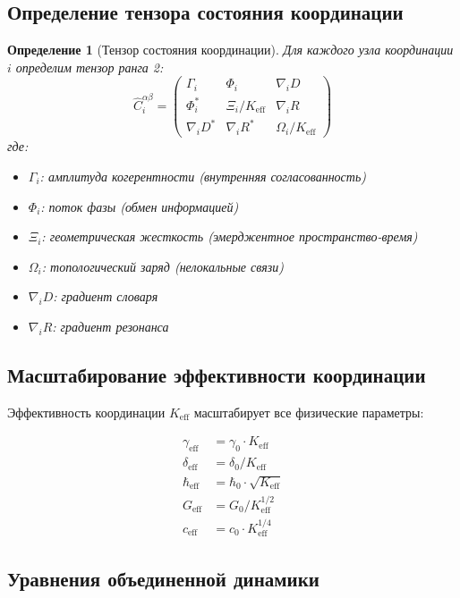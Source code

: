 \documentclass[11pt,a4paper]{article}
\newtheorem{definition}{Определение}
\begin{document}
	\subsection{Определение тензора состояния координации}
	
	\begin{definition}[Тензор состояния координации]
		Для каждого узла координации $i$ определим тензор ранга 2:
		\[
		\hat{C}_i^{\alpha\beta} = \begin{pmatrix}
			\Gamma_i & \Phi_i & \nabla_i D \\
			\Phi_i^* & \Xi_i/K_{\mathrm{eff}} & \nabla_i R \\
			\nabla_i D^* & \nabla_i R^* & \Omega_i/K_{\mathrm{eff}}
		\end{pmatrix}
		\]
		где:
		\begin{itemize}
			\item $\Gamma_i$: амплитуда когерентности (внутренняя согласованность)
			\item $\Phi_i$: поток фазы (обмен информацией)  
			\item $\Xi_i$: геометрическая жесткость (эмерджентное пространство-время)
			\item $\Omega_i$: топологический заряд (нелокальные связи)
			\item $\nabla_i D$: градиент словаря
			\item $\nabla_i R$: градиент резонанса
		\end{itemize}
	\end{definition}
	
	\subsection{Масштабирование эффективности координации}
	
	Эффективность координации $K_{\mathrm{eff}}$ масштабирует все физические параметры:
	
	\[
	\begin{aligned}
		\gamma_{\mathrm{eff}} &= \gamma_0 \cdot K_{\mathrm{eff}} \\
		\delta_{\mathrm{eff}} &= \delta_0 / K_{\mathrm{eff}} \\
		\hbar_{\mathrm{eff}} &= \hbar_0 \cdot \sqrt{K_{\mathrm{eff}}} \\
		G_{\mathrm{eff}} &= G_0 / K_{\mathrm{eff}}^{1/2} \\
		c_{\mathrm{eff}} &= c_0 \cdot K_{\mathrm{eff}}^{1/4}
	\end{aligned}
	\]
	
	\subsection{Уравнения объединенной динамики}
	
\end{document}
